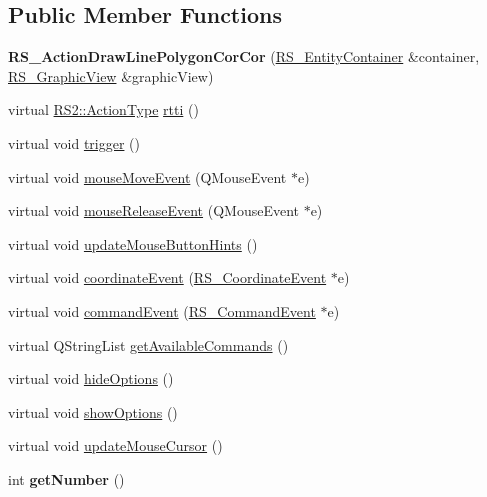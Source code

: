 \subsection*{Public Member Functions}
\begin{DoxyCompactItemize}
\item 
\hypertarget{classRS__ActionDrawLinePolygonCorCor_a85b20996d80dc16715d22bdd44cfa4d5}{{\bfseries R\-S\-\_\-\-Action\-Draw\-Line\-Polygon\-Cor\-Cor} (\hyperlink{classRS__EntityContainer}{R\-S\-\_\-\-Entity\-Container} \&container, \hyperlink{classRS__GraphicView}{R\-S\-\_\-\-Graphic\-View} \&graphic\-View)}\label{classRS__ActionDrawLinePolygonCorCor_a85b20996d80dc16715d22bdd44cfa4d5}

\item 
virtual \hyperlink{classRS2_afe3523e0bc41fd637b892321cfc4b9d7}{R\-S2\-::\-Action\-Type} \hyperlink{classRS__ActionDrawLinePolygonCorCor_a7a303a9130af375e6060d6d4019c4598}{rtti} ()
\item 
virtual void \hyperlink{classRS__ActionDrawLinePolygonCorCor_a1007ee4068be24c81c734994fbaa52e5}{trigger} ()
\item 
virtual void \hyperlink{classRS__ActionDrawLinePolygonCorCor_ae5bce73dbd3ff9032c101e9f7e8fc128}{mouse\-Move\-Event} (Q\-Mouse\-Event $\ast$e)
\item 
virtual void \hyperlink{classRS__ActionDrawLinePolygonCorCor_a853cedaffac566d015eefa7fb57bd12d}{mouse\-Release\-Event} (Q\-Mouse\-Event $\ast$e)
\item 
virtual void \hyperlink{classRS__ActionDrawLinePolygonCorCor_a0e95be669b6e726699cb23bc98ebce27}{update\-Mouse\-Button\-Hints} ()
\item 
virtual void \hyperlink{classRS__ActionDrawLinePolygonCorCor_a64782c048862cd7e62849fc695d0a125}{coordinate\-Event} (\hyperlink{classRS__CoordinateEvent}{R\-S\-\_\-\-Coordinate\-Event} $\ast$e)
\item 
virtual void \hyperlink{classRS__ActionDrawLinePolygonCorCor_aa09890fa07519e47a50825ccb2c82457}{command\-Event} (\hyperlink{classRS__CommandEvent}{R\-S\-\_\-\-Command\-Event} $\ast$e)
\item 
virtual Q\-String\-List \hyperlink{classRS__ActionDrawLinePolygonCorCor_ac680daf0b0bad9ceb654be7b1a87a9fa}{get\-Available\-Commands} ()
\item 
virtual void \hyperlink{classRS__ActionDrawLinePolygonCorCor_a9d4d9aff3728fe73b09d418e3d051a89}{hide\-Options} ()
\item 
virtual void \hyperlink{classRS__ActionDrawLinePolygonCorCor_aa1b94014dce486f163a6fecac7bb2f73}{show\-Options} ()
\item 
virtual void \hyperlink{classRS__ActionDrawLinePolygonCorCor_af2162ac4761494f27d63557e4f1a1be3}{update\-Mouse\-Cursor} ()
\item 
\hypertarget{classRS__ActionDrawLinePolygonCorCor_a545b6152192b7ab1063d77d962e75e61}{int {\bfseries get\-Number} ()}\label{classRS__ActionDrawLinePolygonCorCor_a545b6152192b7ab1063d77d962e75e61}


\end{DoxyCompactItemize}
